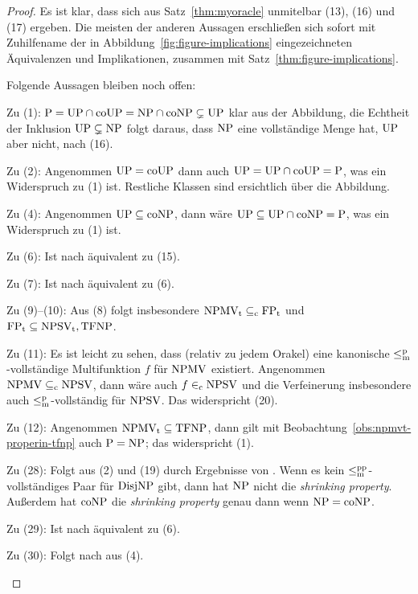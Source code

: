 \begin{proof}
Es ist klar, dass sich aus Satz~\ref{thm:myoracle} unmitelbar (13), (16) und (17) ergeben.
Die meisten der anderen Aussagen erschließen sich sofort mit Zuhilfename der in Abbildung~\ref{fig:figure-implications} eingezeichneten Äquivalenzen und Implikationen, zusammen mit Satz~\ref{thm:figure-implications}.

Folgende Aussagen bleiben noch offen:
\begin{prooflist}[nosep,midpenalty=0]
\item Zu (1): $\mathrm{P}=\mathrm{UP}\cap\mathrm{coUP}=\mathrm{NP}\cap\mathrm{coNP}\subsetneq\mathrm{UP}$ klar aus der Abbildung, die Echtheit der Inklusion $\mathrm{UP}\subsetneq\mathrm{NP}$ folgt daraus, dass $\mathrm{NP}$ eine vollständige Menge hat, $\mathrm{UP}$ aber nicht, nach (16).
\item Zu (2): Angenommen $\mathrm{UP}=\mathrm{coUP}$ dann auch $\mathrm{UP}=\mathrm{UP}\cap\mathrm{coUP}=\mathrm{P}$, was ein Widerspruch zu (1) ist. Restliche Klassen sind ersichtlich über die Abbildung.
\item Zu (4): Angenommen $\mathrm{UP}\subseteq\mathrm{coNP}$, dann wäre $\mathrm{UP}\subseteq \mathrm{UP}\cap\mathrm{coNP}=\mathrm{P}$, was ein Widerspruch zu (1) ist.
\item Zu (6): Ist nach \textcite[Thm.~4]{fenner_inverting_2003} äquivalent zu (15).
\item Zu (7): Ist nach \textcite[Thm.~14]{fenner_inverting_2003} äquivalent zu (6).
\item Zu (9)--(10): Aus (8) folgt insbesondere $\mathrm{NPMV_t}\subseteq_\mathrm{c} \mathrm{FP}_\mathrm{t}$ und $\mathrm{FP}_\mathrm{t}\subseteq \mathrm{NPSV_t}, \mathrm{TFNP}$.
\item Zu (11): Es ist leicht zu sehen, dass (relativ zu jedem Orakel) eine kanonische $\leq_\mathrm{m}^\mathrm{p}$-vollständige Multifunktion $f$ für $\mathrm{NPMV}$ existiert. Angenommen $\mathrm{NPMV} \subseteq_{\mathrm{c}} \mathrm{NPSV}$, dann wäre auch $f\in_\mathrm{c} \mathrm{NPSV}$ und die Verfeinerung insbesondere auch $\leq_\mathrm{m}^\mathrm{p}$-vollständig für $\mathrm{NPSV}$.
    Das widerspricht (20). 
\item Zu (12): Angenommen $\mathrm{NPMV_t}\subseteq \mathrm{TFNP}$, dann gilt mit Beobachtung~\ref{obs:npmvt-properin-tfnp} auch $\mathrm{P}=\mathrm{NP}$; das widerspricht (1).
\item Zu (28): Folgt aus (2) und (19) durch Ergebnisse von \textcite{glaser_shrinking_2011}. Wenn es kein $\leq_\mathrm{m}^\mathrm{pp}$-vollständiges Paar für $\mathrm{DisjNP}$ gibt, dann hat $\mathrm{NP}$ nicht die \emph{shrinking property}. Außerdem hat $\mathrm{coNP}$ die \emph{shrinking property} genau dann wenn $\mathrm{NP}=\mathrm{coNP}$.
\item Zu (29): Ist nach \textcite{glaser_shrinking_2011} äquivalent zu (6).
\item Zu (30): Folgt nach \textcite{glaser_shrinking_2011} aus (4).
\end{prooflist}
\end{proof}




